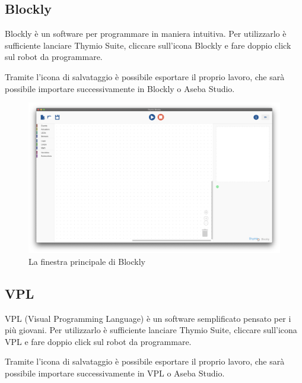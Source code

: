 \documentclass[12pt]{article}
\begin{document}
	\newpage

	\subsection{Blockly}

		Blockly è un software per programmare in maniera intuitiva. Per utilizzarlo è sufficiente lanciare Thymio Suite, cliccare sull'icona Blockly e fare doppio click sul robot da programmare.
		
		Tramite l'icona di salvataggio è possibile esportare il proprio lavoro, che sarà possibile importare successivamente in Blockly o Aseba Studio.
		
		\begin{figure}[H]
			\includegraphics[width=\textwidth]{img/blockly.png}
			\caption{La finestra principale di Blockly}
			\label{main_blockly}
		\end{figure}
		
	\newpage
		
	\subsection{VPL}
	
		VPL (Visual Programming Language) è un software semplificato pensato per i più giovani. Per utilizzarlo è sufficiente lanciare Thymio Suite, cliccare sull'icona VPL e fare doppio click sul robot da programmare.
		
		Tramite l'icona di salvataggio è possibile esportare il proprio lavoro, che sarà possibile importare successivamente in VPL o Aseba Studio.
		
\end{document}
